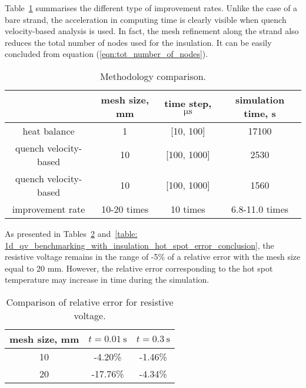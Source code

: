 
Table~\ref{table: 1d_qv_benchmarking_with_insulation_methods_comparison} summarises the different type of improvement rates. Unlike the case of a bare strand, the acceleration in computing time is clearly visible when quench velocity-based analysis is used. In fact, the mesh refinement along the strand also reduces the total number of nodes used for the insulation. It can be easily concluded from equation (\ref{eqn:tot_number_of_nodes}).

\begin{table}[H]
    \caption{Methodology comparison.} 
    \vspace{-1.em} 
    \fontsize{10}{10}
    \selectfont 
    \renewcommand{\arraystretch}{1.5}
    \begin{center}
        \begin{tabular}{ cccc }  
        \hline
          & mesh size, mm & time step, $\upmu \text{s}$ & simulation time, s\\
        \hline
        heat balance & 1 & [10, 100] & 17100 \\
        quench velocity-based & 10 & [100, 1000] & 2530 \\
        quench velocity-based & 10 & [100, 1000] & 1560 \\
        \hline 
        improvement rate & 10-20 times & 10 times & 6.8-11.0 times \\
        \end{tabular}
    \end{center}  
     \label{table: 1d_qv_benchmarking_with_insulation_methods_comparison} 
 \end{table}
 
As presented in Tables~\ref{table: 1d_qv_benchmarking_with_insulation_res_error_conclusion} and~\ref{table: 1d_qv_benchmarking_with_insulation_hot_spot_error_conclusion}, the resistive voltage remains in the range of -5\% of a relative error with the mesh size equal to 20 mm. However, the relative error corresponding to the hot spot temperature may increase in time during the simulation. 

 \begin{table}[H]
    \caption{Comparison of relative error for resistive voltage.} 
    \vspace{-1.em} 
    \fontsize{10}{10}
    \selectfont 
    \renewcommand{\arraystretch}{1.5}
    \begin{center}
        \begin{tabular}{ ccc }  
        \hline
        mesh size, mm & $t=0.01~\text{s}$ & $t=0.3~\text{s}$ \\
        \hline
        10 & -4.20\% & -1.46\% \\
        20 & -17.76\% & -4.34\% \\
        \hline 
        \end{tabular}
    \end{center}  
     \label{table: 1d_qv_benchmarking_with_insulation_res_error_conclusion} 
 \end{table}

